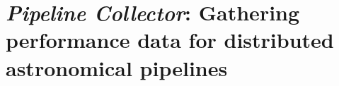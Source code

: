 

\chapter[Pipeline Collector]{\textit{Pipeline Collector}: Gathering performance data for distributed astronomical pipelines}\label{ch:pipeline_collector}


\author{Alexandar P. Mechev$^a$ }

\author{Aske Plaat$^b$}%
\author{J.B. Raymond Oonk$^a$$^,$$^c$}%
\author{Huib T. Intema$^a$}%
\author{Huub J.A. R\"ottgering$^a$}%

\date{\today}%

